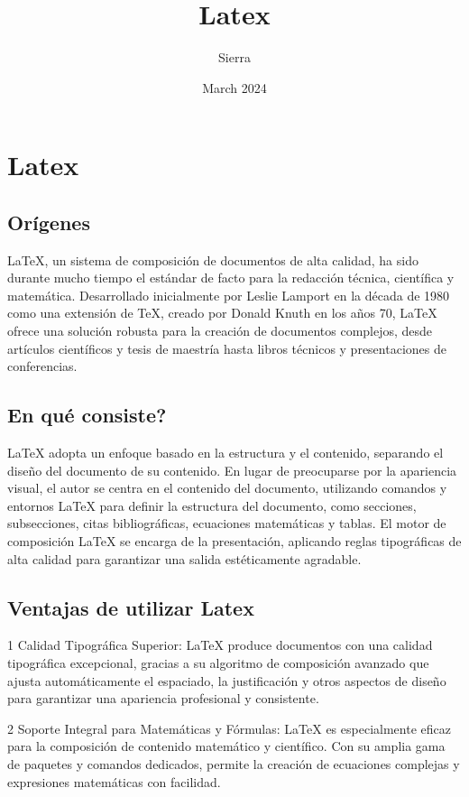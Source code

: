 \documentclass{article}
\title{Latex}
\author{Sierra}
\date{March 2024}
\begin{document}
\maketitle

\section{Latex}

\subsection{Orígenes}
LaTeX, un sistema de composición de documentos de alta calidad, ha sido durante mucho tiempo el estándar de facto para la redacción técnica, científica y matemática. Desarrollado inicialmente por Leslie Lamport en la década de 1980 como una extensión de TeX, creado por Donald Knuth en los años 70, LaTeX ofrece una solución robusta para la creación de documentos complejos, desde artículos científicos y tesis de maestría hasta libros técnicos y presentaciones de conferencias.
\subsection{En qué consiste?}
LaTeX adopta un enfoque basado en la estructura y el contenido, separando el diseño del documento de su contenido. En lugar de preocuparse por la apariencia visual, el autor se centra en el contenido del documento, utilizando comandos y entornos LaTeX para definir la estructura del documento, como secciones, subsecciones, citas bibliográficas, ecuaciones matemáticas y tablas. El motor de composición LaTeX se encarga de la presentación, aplicando reglas tipográficas de alta calidad para garantizar una salida estéticamente agradable.
\subsection{Ventajas de utilizar Latex}
1 Calidad Tipográfica Superior: LaTeX produce documentos con una calidad tipográfica excepcional, gracias a su algoritmo de composición avanzado que ajusta automáticamente el espaciado, la justificación y otros aspectos de diseño para garantizar una apariencia profesional y consistente.

2 Soporte Integral para Matemáticas y Fórmulas: LaTeX es especialmente eficaz para la composición de contenido matemático y científico. Con su amplia gama de paquetes y comandos dedicados, permite la creación de ecuaciones complejas y expresiones matemáticas con facilidad.
\end{document}
